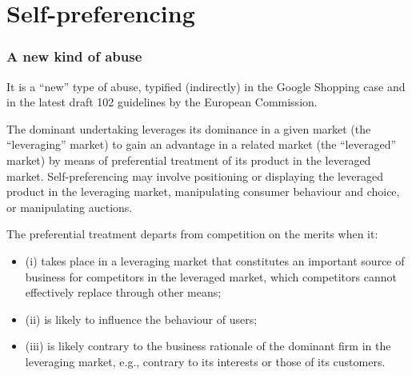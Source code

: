 \section{Self-preferencing}

        \subsubsection{A new kind of abuse}

        It is a “new” type of abuse, typified (indirectly) in the Google Shopping case and in the latest draft 102 guidelines by the European Commission.
    
        
        The dominant undertaking leverages its dominance in a given market (the “leveraging” market) to gain an advantage in a related market (the “leveraged” market) by means of preferential treatment of its product in the leveraged market. Self-preferencing may involve positioning or displaying the leveraged product in the leveraging market, manipulating consumer behaviour and choice, or manipulating auctions. 
        
        The preferential treatment departs from competition on the merits when it:
        \begin{itemize}
            \item (i) takes place in a leveraging market that constitutes an important source of business for competitors in the leveraged market, which competitors cannot effectively replace through other means;
            \item (ii) is likely to influence the behaviour of users;
            \item (iii) is likely contrary to the business rationale of the dominant firm in the leveraging market, e.g., contrary to its interests or those of its customers.
        \end{itemize}

        
    